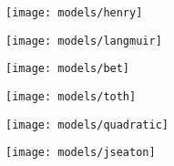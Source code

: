 \begin{figure}[p!]
	\centering

	\begin{subfigure}{0.3\linewidth}

		\parbox[c]{0.1\linewidth}{\caption{}%
			\label{pyg:fgr:henryex}}

		\parbox[b]{0.7\linewidth}{%

			\texttt{[image: models/henry]}}
	\end{subfigure}
	\begin{subfigure}{0.3\linewidth}

		\parbox[c]{0.1\linewidth}{\caption{}%
			\label{pyg:fgr:langmuirex}}

		\parbox[b]{0.7\linewidth}{%

			\texttt{[image: models/langmuir]}}
	\end{subfigure}
	\begin{subfigure}{0.3\linewidth}

		\parbox[c]{0.1\linewidth}{\caption{}%
			\label{pyg:fgr:betex}}

		\parbox[b]{0.7\linewidth}{%

			\texttt{[image: models/bet]}}
	\end{subfigure}

	\begin{subfigure}{0.3\linewidth}

		\parbox[c]{0.1\linewidth}{\caption{}%
			\label{pyg:fgr:tothex}}

		\parbox[b]{0.7\linewidth}{%

			\texttt{[image: models/toth]}}
	\end{subfigure}
	\begin{subfigure}{0.3\linewidth}

		\parbox[c]{0.1\linewidth}{\caption{}%
			\label{pyg:fgr:quadraticex}}

		\parbox[b]{0.7\linewidth}{%

			\texttt{[image: models/quadratic]}}
	\end{subfigure}
	\begin{subfigure}{0.3\linewidth}

		\parbox[c]{0.1\linewidth}{\caption{}%
			\label{pyg:fgr:jseatonex}}

		\parbox[b]{0.7\linewidth}{%

			\texttt{[image: models/jseaton]}}
	\end{subfigure}
	\\
	\begin{subfigure}{0.3\linewidth}


\end{subfigure}
\end{figure}
